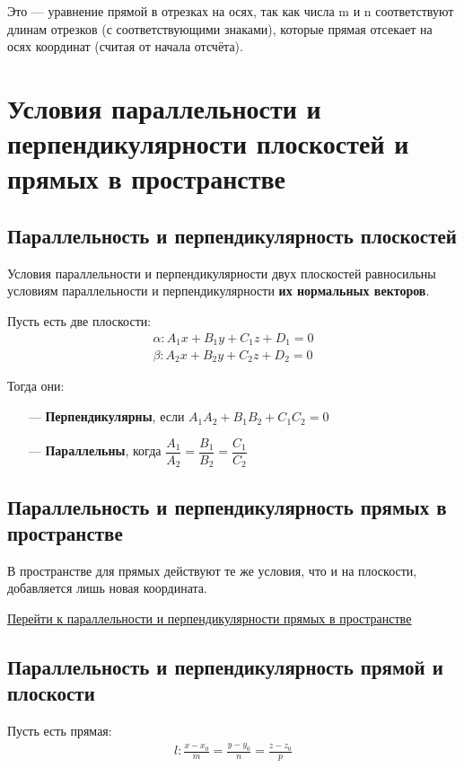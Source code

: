 \documentclass[a4paper,12pt]{extbook}
\theoremstyle{numbered}
\theoremstyle{named}
\theoremstyle{named}
\theoremstyle{named}
\newcommand{\plink}[2]{\hyperref[#1]{\color{blue}\underline{#2}}}
\begin{document}
Это — уравнение прямой в отрезках на осях, так как числа m и n соответствуют длинам отрезков (с соответствующими знаками), которые прямая отсекает на осях координат (считая от начала отсчёта).

\section{Условия параллельности и перпендикулярности плоскостей и прямых в пространстве}
\label{sec:parallel_perpendicular_planes}

\subsection*{Параллельность и перпендикулярность плоскостей}
Условия параллельности и перпендикулярности двух плоскостей равносильны условиям параллельности и перпендикулярности \textbf{их нормальных векторов}.

Пусть есть две плоскости:
\begin{gather*}
    \alpha: A_1x + B_1y + C_1z + D_1 = 0 \\
    \beta: A_2x + B_2y + C_2z + D_2 = 0
\end{gather*}

Тогда они:
\begin{itemize}
    \item[—]{\textbf{Перпендикулярны}, если \(A_1A_2 + B_1B_2 + C_1C_2 = 0\)}
    \item[—]{\textbf{Параллельны}, когда \(\dfrac{A_1}{A_2} = \dfrac{B_1}{B_2} = \dfrac{C_1}{C_2}\)}
\end{itemize}

\subsection*{Параллельность и перпендикулярность прямых в пространстве}
В пространстве для прямых действуют те же условия, что и на плоскости, добавляется лишь новая координата.

\plink{sec:parallel_perpendicular_lines}{Перейти к параллельности и перпендикулярности прямых в пространстве}

\subsection*{Параллельность и перпендикулярность прямой и плоскости}
Пусть есть прямая:
\begin{gather*}
    l: \frac{x - x_0}{m} = \frac{y - y_0}{n} = \frac{z - z_0}{p}
\end{gather*}
\end{document}
